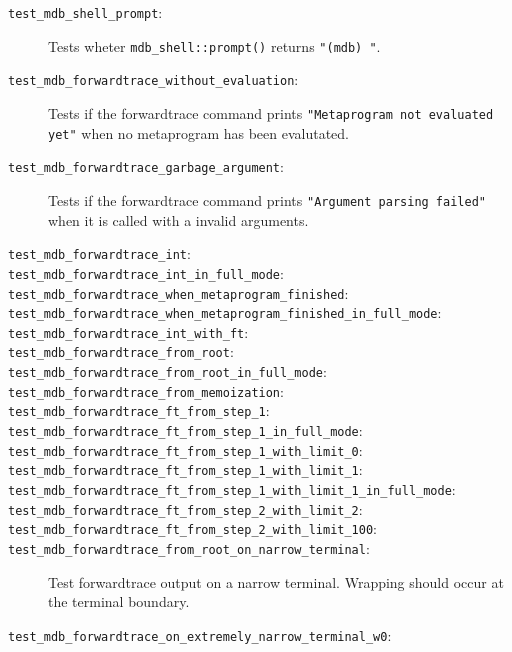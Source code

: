 \begin{description}
    \item[\texttt{test\_mdb\_shell\_prompt}:]
        Tests wheter \texttt{mdb\_shell::prompt()} returns \texttt{"(mdb) "}.
    \item[\texttt{test\_mdb\_forwardtrace\_without\_evaluation}:]
        Tests if the forwardtrace command prints
        \texttt{"Metaprogram not evaluated yet"} when no metaprogram has been
        evalutated.
    \item[\texttt{test\_mdb\_forwardtrace\_garbage\_argument}:]
        Tests if the forwardtrace command prints
        \texttt{"Argument parsing failed"} when it is called with a invalid
        arguments.
    \item[\texttt{test\_mdb\_forwardtrace\_int}:]
    \item[\texttt{test\_mdb\_forwardtrace\_int\_in\_full\_mode}:]
    \item[\texttt{test\_mdb\_forwardtrace\_when\_metaprogram\_finished}:]
    \item[\texttt{test\_mdb\_forwardtrace\_when\_metaprogram\_finished\_in\_full\_mode}:]
    \item[\texttt{test\_mdb\_forwardtrace\_int\_with\_ft}:]
    \item[\texttt{test\_mdb\_forwardtrace\_from\_root}:]
    \item[\texttt{test\_mdb\_forwardtrace\_from\_root\_in\_full\_mode}:]
    \item[\texttt{test\_mdb\_forwardtrace\_from\_memoization}:]
    \item[\texttt{test\_mdb\_forwardtrace\_ft\_from\_step\_1}:]
    \item[\texttt{test\_mdb\_forwardtrace\_ft\_from\_step\_1\_in\_full\_mode}:]
    \item[\texttt{test\_mdb\_forwardtrace\_ft\_from\_step\_1\_with\_limit\_0}:]
    \item[\texttt{test\_mdb\_forwardtrace\_ft\_from\_step\_1\_with\_limit\_1}:]
    \item[\texttt{test\_mdb\_forwardtrace\_ft\_from\_step\_1\_with\_limit\_1\_in\_full\_mode}:]
    \item[\texttt{test\_mdb\_forwardtrace\_ft\_from\_step\_2\_with\_limit\_2}:]
    \item[\texttt{test\_mdb\_forwardtrace\_ft\_from\_step\_2\_with\_limit\_100}:]
    \item[\texttt{test\_mdb\_forwardtrace\_from\_root\_on\_narrow\_terminal}:]
        Test forwardtrace output on a narrow terminal. Wrapping should occur
        at the terminal boundary.
    \item[\texttt{test\_mdb\_forwardtrace\_on\_extremely\_narrow\_terminal\_w0}:]

\end{description}
